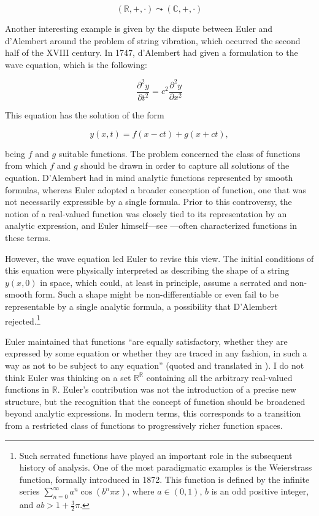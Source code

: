 \documentclass[11pt,a4paper]{book}
\theoremstyle{plain}
\begin{document}
$$ (\mathbb{R}, +, \cdot) \leadsto (\mathbb{C}, +, \cdot) $$


Another interesting example is given by the dispute between Euler and d'Alembert around the problem of string vibration, which occurred the second half of the XVIII century. In 1747, d'Alembert had given a formulation to the wave equation, which is the following:

\[
\frac{\partial^2 y}{\partial t^2}
=
c^2 \frac{\partial^2 y}{\partial x^2}
\]

This equation has the solution of the form

\[
y(x,t) = f(x-ct) + g(x+ct),
\]

being \(f\) and \(g\) suitable functions. The problem concerned the class of functions from which \(f\) and \(g\) should be drawn in order to capture all solutions of the equation. D'Alembert had in mind analytic functions represented by smooth formulas, whereas Euler adopted a broader conception of function, one that was not necessarily expressible by a single formula. Prior to this controversy, the notion of a real-valued function was closely tied to its representation by an analytic expression, and Euler himself---see \textcite[p.~117]{Maddy1997}---often characterized functions in these terms.

However, the wave equation led Euler to revise this view. The initial conditions of this equation were physically interpreted as describing the shape of a string \(y(x,0)\) in space, which could, at least in principle, assume a serrated and non-smooth form. Such a shape might be non-differentiable or even fail to be representable by a single analytic formula, a possibility that D'Alembert rejected.\footnote{Such serrated functions have played an important role in the subsequent history of analysis. One of the most paradigmatic examples is the Weierstrass function, formally introduced in 1872. This function is defined by the infinite series \(\sum_{n=0}^{\infty} a^n \cos(b^n \pi x)\), where \(a \in (0,1)\), \(b\) is an odd positive integer, and \(ab > 1 + \frac{3}{2}\pi\).}

Euler maintained that functions ``are equally satisfactory, whether they are expressed by some equation or whether they are traced in any fashion, in such a way as not to be subject to any equation'' (quoted and translated in \textcite[p.~288]{Truesdell1960}). I do not think Euler was thinking on a set $\mathbb{R}^\mathbb{R}$ containing all the arbitrary real-valued functions in $\mathbb{R}$. Euler's contribution was not the introduction of a precise new structure, but the recognition that the concept of function should be broadened beyond analytic expressions. In modern terms, this corresponds to a transition from a restricted class of functions to progressively richer function spaces.
\end{document}
